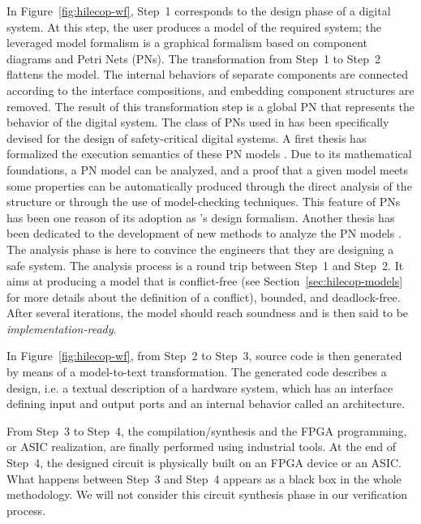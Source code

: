 \documentclass[pdflatex,sn-mathphys]{sn-jnl}%
\theoremstyle{thmstyleone}%
\theoremstyle{thmstyletwo}%
\theoremstyle{thmstylethree}%
\begin{document}
In Figure~\ref{fig:hilecop-wf}, Step~1 corresponds to the design phase
of a digital system. At this step, the user produces a model of the
required system; the leveraged model formalism is a graphical
formalism based on component diagrams and Petri Nets (PNs).  The
transformation from Step~1 to Step~2 flattens the model. The internal
behaviors of separate components are connected according to the
interface compositions, and embedding component structures are
removed. The result of this transformation step is a global PN that
represents the behavior of the digital system.  The class of PNs used
in \hilecop{} has been specifically devised for the design of
safety-critical digital systems. A first thesis has formalized the
execution semantics of these PN models
\cite{Leroux2014}. %
Due to its mathematical foundations, a PN model can be analyzed, and a
proof that a given model meets some properties can be automatically
produced through the direct analysis of the structure or through the
use of model-checking techniques. This feature of PNs has been one
reason of its adoption as \hilecop{}'s design formalism. Another
thesis has been dedicated to the development of new methods to analyze
the \hilecop{} PN models \cite{Merzoug2018}. The analysis phase is
here to convince the engineers that they are designing a safe
system. The analysis process is a round trip between Step~1 and
Step~2.  It aims at producing a model that is conflict-free (see
Section~\ref{sec:hilecop-models} for more details about the definition
of a conflict), bounded, and deadlock-free.  After several iterations,
the model should reach soundness and is then said to be
\emph{implementation-ready}.

In Figure~\ref{fig:hilecop-wf}, from Step~2 to Step~3, \vhdl{} source
code is then generated by means of a model-to-text transformation. The
generated code describes a \vhdl{} design, i.e. a textual description
of a hardware system, which has an interface defining input and output
ports and an internal behavior called an architecture.

From Step~3 to Step~4, the \vhdl{} compilation/synthesis and the FPGA
programming, or ASIC realization, are finally performed using
industrial tools. At the end of Step~4, the designed circuit is
physically built on an FPGA device or an ASIC.  What happens between
Step~3 and Step~4 appears as a black box in the whole \hilecop{}
methodology. We will not consider this circuit synthesis phase in our
verification process.
\end{document}
